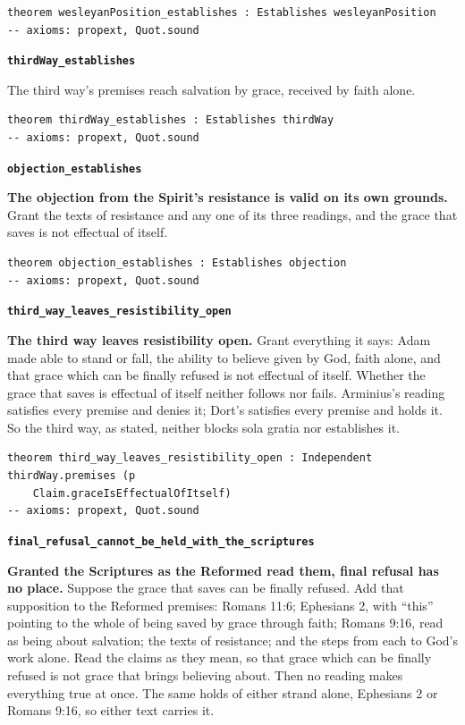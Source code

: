 \documentclass[11pt]{article}
\begin{document}
{\small\begin{verbatim}
theorem wesleyanPosition_establishes : Establishes wesleyanPosition
-- axioms: propext, Quot.sound
\end{verbatim}}
\par\medskip\noindent\textbf{\texttt{third\allowbreak{}Way\_\allowbreak{}establishes}}\par\nobreak\noindent
The third way’s premises reach salvation by grace, received by faith alone.

{\small\begin{verbatim}
theorem thirdWay_establishes : Establishes thirdWay
-- axioms: propext, Quot.sound
\end{verbatim}}
\par\medskip\noindent\textbf{\texttt{objection\_\allowbreak{}establishes}}\par\nobreak\noindent
\textbf{The objection from the Spirit’s resistance is valid on its own grounds.} Grant the texts of resistance and any one of its three readings, and the grace that saves is not effectual of itself.

{\small\begin{verbatim}
theorem objection_establishes : Establishes objection
-- axioms: propext, Quot.sound
\end{verbatim}}
\par\medskip\noindent\textbf{\texttt{third\_\allowbreak{}way\_\allowbreak{}leaves\_\allowbreak{}resistibility\_\allowbreak{}open}}\par\nobreak\noindent
\textbf{The third way leaves resistibility open.} Grant everything it says: Adam made able to stand or fall, the ability to believe given by God, faith alone, and that grace which can be finally refused is not effectual of itself. Whether the grace that saves is effectual of itself neither follows nor fails. Arminius’s reading satisfies every premise and denies it; Dort’s satisfies every premise and holds it. So the third way, as stated, neither blocks sola gratia nor establishes it.

{\small\begin{verbatim}
theorem third_way_leaves_resistibility_open : Independent thirdWay.premises (p
    Claim.graceIsEffectualOfItself)
-- axioms: propext, Quot.sound
\end{verbatim}}
\par\medskip\noindent\textbf{\texttt{final\_\allowbreak{}refusal\_\allowbreak{}cannot\_\allowbreak{}be\_\allowbreak{}held\_\allowbreak{}with\_\allowbreak{}the\_\allowbreak{}scriptures}}\par\nobreak\noindent
\textbf{Granted the Scriptures as the Reformed read them, final refusal has no place.} Suppose the grace that saves can be finally refused. Add that supposition to the Reformed premises: Romans 11:6; Ephesians 2, with “this” pointing to the whole of being saved by grace through faith; Romans 9:16, read as being about salvation; the texts of resistance; and the steps from each to God’s work alone. Read the claims as they mean, so that grace which can be finally refused is not grace that brings believing about. Then no reading makes everything true at once. The same holds of either strand alone, Ephesians 2 or Romans 9:16, so either text carries it.
\end{document}
